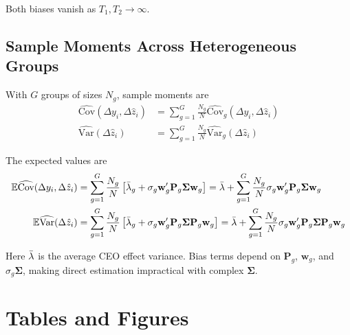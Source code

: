 \documentclass[11pt,a4paper]{article}
\newcommand{\Var}{\text{Var}}
\newcommand{\Cov}{\text{Cov}}
\begin{document}
Both biases vanish as $T_1,T_2\to\infty$. 

\subsection{Sample Moments Across Heterogeneous Groups}

With $G$ groups of sizes $N_g$, sample moments are
\begin{align}
\widehat{\Cov}(\Delta y_i,\Delta \hat z_i) &= \sum_{g=1}^G \frac{N_g}{N} \widehat{\Cov}_g(\Delta y_i,\Delta \hat z_i)\\
\widehat{\Var}(\Delta \hat z_i) &= \sum_{g=1}^G \frac{N_g}{N} \widehat{\Var}_g(\Delta \hat z_i)
\end{align}

The expected values are
\begin{align}
\mathbb E\widehat{\Cov}(\Delta y_i,\Delta \hat z_i) &= \sum_{g=1}^G \frac{N_g}{N} \left[ 
\Bar\lambda_g
+ \sigma_g \mathbf w_g' \mathbf P_g\mathbf\Sigma \mathbf w_g\right] = 
\Bar\lambda +\sum_{g=1}^G \frac{N_g}{N} \sigma_g \mathbf w_g' \mathbf P_g\mathbf\Sigma \mathbf w_g\\
\mathbb E\widehat{\Var}(\Delta \hat z_i) &= \sum_{g=1}^G \frac{N_g}{N} \left[ 
\Bar\lambda_g
+ \sigma_g \mathbf w_g' \mathbf P_g\mathbf\Sigma \mathbf P_g \mathbf w_g\right] = 
\Bar\lambda +\sum_{g=1}^G \frac{N_g}{N} \sigma_g \mathbf w_g' \mathbf P_g\mathbf\Sigma \mathbf P_g \mathbf w_g
\end{align}

Here $\Bar\lambda$ is the average CEO effect variance. Bias terms depend on $\mathbf P_g$, $\mathbf w_g$, and $\sigma_g\mathbf\Sigma$, making direct estimation impractical with complex $\mathbf\Sigma$.

\clearpage


\clearpage

\section*{Tables and Figures}
\end{document}
